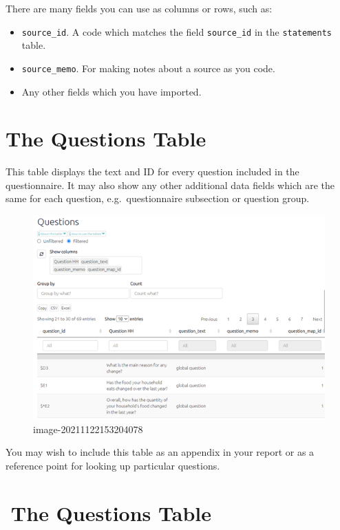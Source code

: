\documentclass[
]{book}
\providecommand{\tightlist}{%
  \setlength{\itemsep}{0pt}\setlength{\parskip}{0pt}}
\begin{document}
There are many fields you can use as columns or rows, such as:

\begin{itemize}
\tightlist
\item
  \texttt{source\_id}. A code which matches the field \texttt{source\_id} in the \texttt{statements} table.
\item
  \texttt{source\_memo}. For making notes about a source as you code.
\item
  Any other fields which you have imported.
\end{itemize}

\hypertarget{xthe-questions-table-old}{%
\chapter{The Questions Table}\label{xthe-questions-table-old}}

This table displays the text and ID for every question included in the questionnaire. It may also show any other additional data fields which are the same for each question, e.g.~questionnaire subsection or question group.

\begin{figure}
\centering
\includegraphics[width=6.77083in,height=\textheight]{_assets/image-20211122153204078.png}
\caption{image-20211122153204078}
\end{figure}

You may wish to include this table as an appendix in your report or as a reference point for looking up particular questions.

\hypertarget{xthe-questions-table}{%
\chapter{🧪The Questions Table}\label{xthe-questions-table}}
\end{document}
